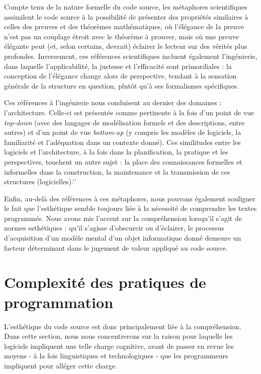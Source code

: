 \documentclass{article}
\begin{document}
Compte tenu de la nature formelle du code source, les métaphores scientifiques assimilent le code source à la possibilité de présenter des propriétés similaires à celles des preuves et des théorèmes mathématiques, où l'élégance de la preuve n'est pas un couplage étroit avec le théorème à prouver, mais où une preuve élégante peut (et, selon certains, devrait) éclairer le lecteur sur des vérités plus profondes. Inversement, ces références scientifiques incluent également l'ingénierie, dans laquelle l'applicabilité, la justesse et l'efficacité sont primordiales : la conception de l'élégance change alors de perspective, tendant à la sensation générale de la structure en question, plutôt qu'à ses formalismes spécifiques.

Ces références à l'ingénierie nous conduisent au dernier des domaines : l'architecture. Celle-ci est présentée comme pertinente à la fois d'un point de vue \emph{top-down} (avec des langages de modélisation formels et des descriptions, entre autres) et d'un point de vue \emph{bottom-up} (y compris les modèles de logiciels, la familiarité et l'adéquation dans un contexte donné). Ces similitudes entre les logiciels et l'architecture, à la fois dans la planification, la pratique et les perspectives, touchent un autre sujet : la place des connaissances formelles et informelles dans la construction, la maintenance et la transmission de ces structures (logicielles).`'

Enfin, au-delà des références à ces métaphores, nous pouvons également souligner le fait que l'esthétique semble toujours liée à la nécessité de comprendre les textes programmés. Nous avons mis l'accent sur la compréhension lorsqu'il s'agit de normes esthétiques : qu'il s'agisse d'obscurcir ou d'éclairer, le processus d'acquisition d'un modèle mental d'un objet informatique donné demeure un facteur déterminant dans le jugement de valeur appliqué au code source.

\section*{Complexité des pratiques de programmation}

L'esthétique du code source est donc principalement liée à la compréhension. Dans cette section, nous nous concentrerons sur la raison pour laquelle les logiciels impliquent une telle charge cognitive, avant de passer en revue les moyens - à la fois linguistiques et technologiques - que les programmeurs impliquent pour alléger cette charge.
\end{document}
